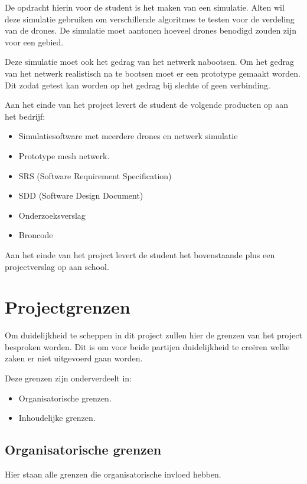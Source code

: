 \documentclass[a4paper, 11pt, oneside]{report}
\begin{document}
De opdracht hierin voor de student is het maken van een simulatie.
Alten wil deze simulatie gebruiken om verschillende algoritmes te testen voor de verdeling van de drones.
De simulatie moet aantonen hoeveel drones benodigd zouden zijn voor een gebied.

Deze simulatie moet ook het gedrag van het netwerk nabootsen.
Om het gedrag van het netwerk realistisch na te bootsen moet er een prototype gemaakt worden.
Dit zodat getest kan worden op het gedrag bij slechte of geen verbinding.

Aan het einde van het project levert de student de volgende producten op aan het bedrijf:

\begin{itemize}
\item Simulatiesoftware met meerdere drones en netwerk simulatie
\item Prototype mesh netwerk.
\item SRS (Software Requirement Specification)
\item SDD (Software Design Document)
\item Onderzoeksverslag
\item Broncode
\end{itemize}

Aan het einde van het project levert de student het bovenstaande plus een projectverslag op aan school.


\chapter{Projectgrenzen}
\label{chapter:projectgrenzen}
Om duidelijkheid te scheppen in dit project zullen hier de grenzen van het project besproken worden.
Dit is om voor beide partijen duidelijkheid te creëren welke zaken er niet uitgevoerd gaan worden. 

Deze grenzen zijn onderverdeelt in:

\begin{itemize}
	\item Organisatorische grenzen.
	\item Inhoudelijke grenzen.
\end{itemize}

\section{Organisatorische grenzen}
Hier staan alle grenzen die organisatorische invloed hebben. 
\end{document}
